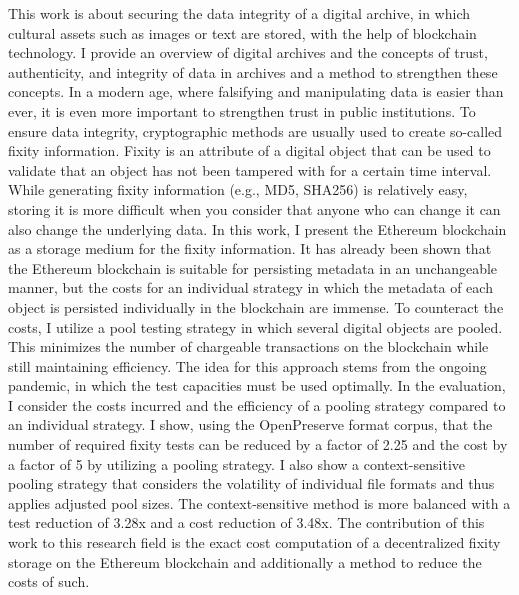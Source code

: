 This work is about securing the data integrity of a digital archive, in which cultural assets such as images or text are stored, with the help of blockchain technology. I provide an overview of digital archives and the concepts of trust, authenticity, and integrity of data in archives and a method to strengthen these concepts. In a modern age, where falsifying and manipulating data is easier than ever, it is even more important to strengthen trust in public institutions.
To ensure data integrity, cryptographic methods are usually used to create so-called fixity information. Fixity is an attribute of a digital object that can be used to validate that an object has not been tampered with for a certain time interval. While generating fixity information (e.g., MD5, SHA256) is relatively easy, storing it is more difficult when you consider that anyone who can change it can also change the underlying data.
In this work, I present the Ethereum blockchain as a storage medium for the fixity information. It has already been shown that the Ethereum blockchain is suitable for persisting metadata in an unchangeable manner, but the costs for an individual strategy in which the metadata of each object is persisted individually in the blockchain are immense.
To counteract the costs, I utilize a pool testing strategy in which several digital objects are pooled. This minimizes the number of chargeable transactions on the blockchain while still maintaining efficiency. The idea for this approach stems from the ongoing pandemic, in which the test capacities must be used optimally.
In the evaluation, I consider the costs incurred and the efficiency of a pooling strategy compared to an individual strategy. I show, using the OpenPreserve format corpus, that the number of required fixity tests can be reduced by a factor of 2.25 and the cost by a factor of 5 by utilizing a pooling strategy. I also show a context-sensitive pooling strategy that considers the volatility of individual file formats and thus applies adjusted pool sizes. The context-sensitive method is more balanced with a test reduction of 3.28x and a cost reduction of 3.48x.
The contribution of this work to this research field is the exact cost computation of a decentralized fixity storage on the Ethereum blockchain and additionally a method to reduce the costs of such.
